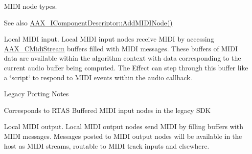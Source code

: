 M\+I\+D\+I node types. 

\begin{DoxySeeAlso}{See also}
\hyperlink{a00088_a6284dda9ccca898e33075de29dad4e39}{A\+A\+X\+\_\+\+I\+Component\+Descriptor\+::\+Add\+M\+I\+D\+I\+Node()} 
\end{DoxySeeAlso}
\begin{Desc}
\item[Enumerator]\par
\begin{description}
\item[{\em 
\hypertarget{a00206_a5e1dffce35d05990dbbad651702678e4ae57de2b04978fe2e75f5bdeb034bda44}{}A\+A\+X\+\_\+e\+M\+I\+D\+I\+Node\+Type\+\_\+\+Local\+Input\label{a00206_a5e1dffce35d05990dbbad651702678e4ae57de2b04978fe2e75f5bdeb034bda44}
}]Local M\+I\+D\+I input. Local M\+I\+D\+I input nodes receive M\+I\+D\+I by accessing \hyperlink{a00025}{A\+A\+X\+\_\+\+C\+Midi\+Stream} buffers filled with M\+I\+D\+I messages. These buffers of M\+I\+D\+I data are available within the algorithm context with data corresponding to the current audio buffer being computed. The Effect can step through this buffer like a \char`\"{}script\char`\"{} to respond to M\+I\+D\+I events within the audio callback.

\begin{DoxyRefDesc}{Legacy Porting Notes}
\item[\hyperlink{a00384__porting_notes000027}{Legacy Porting Notes}]Corresponds to R\+T\+A\+S Buffered M\+I\+D\+I input nodes in the legacy S\+D\+K \end{DoxyRefDesc}
\item[{\em 
\hypertarget{a00206_a5e1dffce35d05990dbbad651702678e4acc1b5f2109c508b20a65b5e0fdcd643f}{}A\+A\+X\+\_\+e\+M\+I\+D\+I\+Node\+Type\+\_\+\+Local\+Output\label{a00206_a5e1dffce35d05990dbbad651702678e4acc1b5f2109c508b20a65b5e0fdcd643f}
}]Local M\+I\+D\+I output. Local M\+I\+D\+I output nodes send M\+I\+D\+I by filling buffers with M\+I\+D\+I messages. Messages posted to M\+I\+D\+I output nodes will be available in the host as M\+I\+D\+I streams, routable to M\+I\+D\+I track inputs and elsewhere.


\end{description}
\end{Desc}
